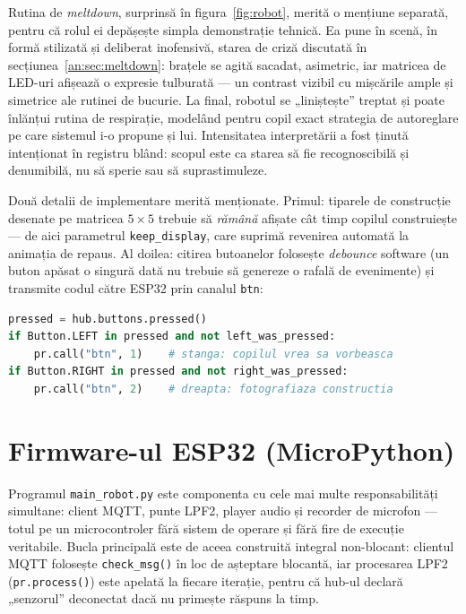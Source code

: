 Rutina de \emph{meltdown}, surprinsă în figura~\ref{fig:robot}, merită o mențiune separată, pentru că rolul ei depășește simpla demonstrație tehnică. Ea pune în scenă, în formă stilizată și deliberat inofensivă, starea de criză discutată în secțiunea~\ref{an:sec:meltdown}: brațele se agită sacadat, asimetric, iar matricea de LED-uri afișează o expresie tulburată — un contrast vizibil cu mișcările ample și simetrice ale rutinei de bucurie. La final, robotul se „liniștește” treptat și poate înlănțui rutina de respirație, modelând pentru copil exact strategia de autoreglare pe care sistemul i-o propune și lui. Intensitatea interpretării a fost ținută intenționat în registru blând: scopul este ca starea să fie recognoscibilă și denumibilă, nu să sperie sau să suprastimuleze.

Două detalii de implementare merită menționate. Primul: tiparele de construcție desenate pe matricea $5\times5$ trebuie să \emph{rămână} afișate cât timp copilul construiește — de aici parametrul \texttt{keep\_display}, care suprimă revenirea automată la animația de repaus. Al doilea: citirea butoanelor folosește \emph{debounce} software (un buton apăsat o singură dată nu trebuie să genereze o rafală de evenimente) și transmite codul către ESP32 prin canalul \texttt{btn}:

\begin{lstlisting}[language=Python, caption={Raportarea butoanelor către ESP32 (fragment).}, label={lst:btn}]
pressed = hub.buttons.pressed()
if Button.LEFT in pressed and not left_was_pressed:
    pr.call("btn", 1)    # stanga: copilul vrea sa vorbeasca
if Button.RIGHT in pressed and not right_was_pressed:
    pr.call("btn", 2)    # dreapta: fotografiaza constructia
\end{lstlisting}

\section{Firmware-ul ESP32 (MicroPython)}

Programul \texttt{main\_robot.py} este componenta cu cele mai multe responsabilități simultane: client MQTT, punte LPF2, player audio și recorder de microfon — totul pe un microcontroler fără sistem de operare și fără fire de execuție veritabile. Bucla principală este de aceea construită integral non-blocant: clientul MQTT folosește \texttt{check\_msg()} în loc de așteptare blocantă, iar procesarea LPF2 (\texttt{pr.process()}) este apelată la fiecare iterație, pentru că hub-ul declară „senzorul” deconectat dacă nu primește răspuns la timp.

